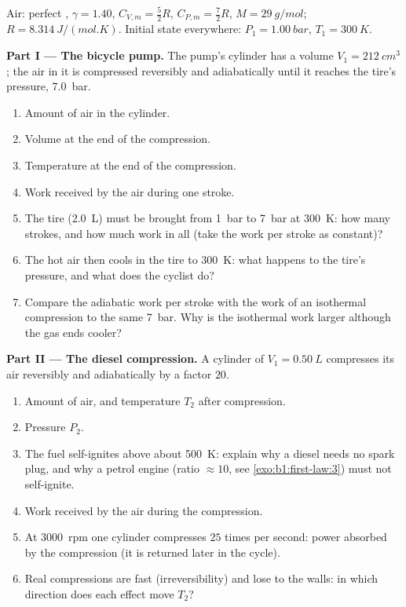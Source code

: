 \begin{problem}
\label{pb:b1:first-law:1}
Air: perfect , $\gamma = 1.40$, $C_{V,m} = \tfrac52 R$, $C_{P,m} =
\tfrac72 R$, $M = \qty{29}{g/mol}$; $R = \qty{8.314}{J/(mol.K)}$. Initial
state everywhere: $P_1 = \qty{1.00}{bar}$, $T_1 = \qty{300}{K}$.

\medskip
\noindent\textbf{Part I --- The bicycle pump.}
The pump's cylinder has a volume $V_1 = \qty{212}{cm^3}$; the air in it
is compressed reversibly and adiabatically until it reaches the tire's
pressure, \qty{7.0}{bar}.
\begin{enumerate}
  \item Amount of air in the cylinder.
  \item Volume at the end of the compression.
  \item Temperature at the end of the compression.
  \item Work received by the air during one stroke.
  \item The tire (\qty{2.0}{L}) must be brought from \qty{1}{bar} to
        \qty{7}{bar} at \qty{300}{K}: how many strokes, and how much work
        in all (take the work per stroke as constant)?
  \item The hot air then cools in the tire to \qty{300}{K}: what happens
        to the tire's pressure, and what does the cyclist do?
  \item Compare the adiabatic work per stroke with the work of an
        isothermal compression to the same \qty{7}{bar}. Why is the
        isothermal work larger although the gas ends cooler?
\end{enumerate}

\medskip
\noindent\textbf{Part II --- The diesel compression.}
A cylinder of $V_1 = \qty{0.50}{L}$ compresses its air reversibly and
adiabatically by a factor $20$.
\begin{enumerate}[resume]
  \item Amount of air, and temperature $T_2$ after compression.
  \item Pressure $P_2$.
  \item The fuel self-ignites above about \qty{500}{K}: explain why a
        diesel needs no spark plug, and why a petrol engine (ratio
        $\approx 10$, see \cref{exo:b1:first-law:3}) must not self-ignite.
  \item Work received by the air during the compression.
  \item At \qty{3000}{rpm} one cylinder compresses $25$ times per second:
        power absorbed by the compression (it is returned later in the
        cycle).
  \item Real compressions are fast (irreversibility) and lose  to the
        walls: in which direction does each effect move $T_2$?
\end{enumerate}


\end{problem}
